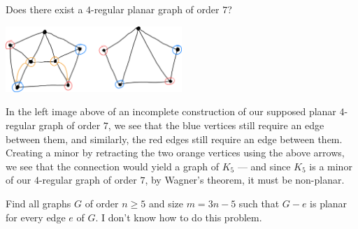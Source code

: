 \documentclass[10pt]{extarticle}
\begin{document}
  \begin{problem}{6}
    Does there exist a $4$-regular planar graph of order $7$?
    \tcblower
    \begin{center}
      \includegraphics[width=0.5\textwidth]{images/10_6_sol.png}
    \end{center}
    In the left image above of an incomplete construction of our supposed planar $4$-regular graph of order $7$, we see that the blue vertices still require an edge between them, and similarly, the red edges still require an edge between them.\\

    Creating a minor by retracting the two orange vertices using the above arrows, we see that the connection would yield a graph of $K_5$ --- and since $K_5$ is a minor of our $4$-regular graph of order $7$, by Wagner's theorem, it must be non-planar.
  \end{problem}
  \begin{problem}{7}
    Find all graphs $G$ of order $n\geq 5$ and size $m = 3n-5$ such that $G-e$ is planar for every edge $e$ of $G$.
    \tcblower
    I don't know how to do this problem.
  \end{problem}
\end{document}
